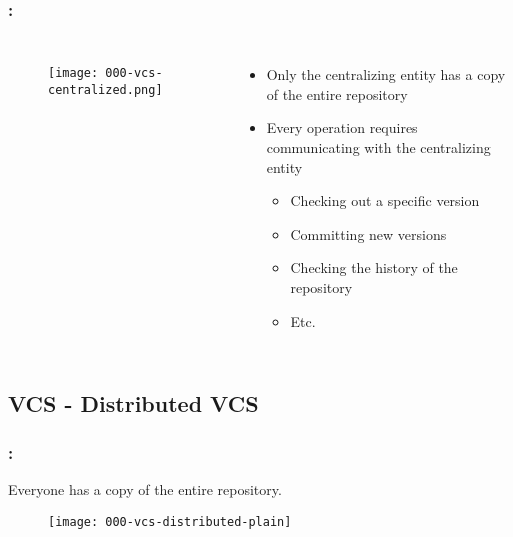 \begin{frame}
    \frametitle{\secname: \small\subsecname\normalsize}

    \begin{columns}
            \begin{figure}[h]
                \texttt{[image: 000-vcs-centralized.png]}
                \centering
            \end{figure}

            \begin{itemize}
                \item Only the centralizing entity has a copy of the entire repository
                \item Every operation requires communicating with the centralizing entity
                \begin{itemize}
                    \item Checking out a specific version
                    \item Committing new versions
                    \item Checking the history of the repository
                    \item Etc.
                \end{itemize}
            \end{itemize}
    \end{columns}
\end{frame}

\subsection{VCS - Distributed VCS}
\begin{frame}
    \frametitle{\secname: \small\subsecname\normalsize}

    Everyone has a copy of the entire repository.

    \begin{figure}[h]
        \texttt{[image: 000-vcs-distributed-plain]}
        \centering
    \end{figure}
\end{frame}

